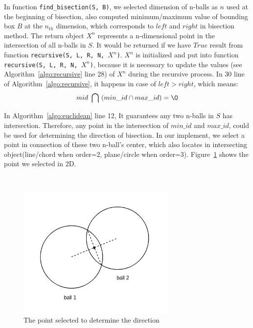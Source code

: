 In function \texttt{find\_bisection(S, B)}, we selected dimension of n-balls as
$n$ used at the beginning of bisection, also computed minimum/maximum value of
bounding box $B$ at the $n_{th}$ dimension, which corresponds to $left$ and
$right$ in bisection method. The return object $X^n$ represents a n-dimensional
point in the intersection of all n-balls in $S$. It would be returned if we have
$True$ result from function \texttt{recursive(S, L, R, N, $X^n$)}. $X^n$ is
initialized and put into function \texttt{recursive(S, L, R, N, $X^n$)}, because
it is necessary to update the values (see Algorithm~\ref{algo:recursive} line
28) of $X^n$ during the recursive process. In 30 line of
Algorithm~\ref{algo:recursive}, it happens in case of $left > right$, which
means:
\begin{equation*}
    mid \  \bigcap \  (min\_id \cap max\_id) = \O
\end{equation*}

In Algorithm~\ref{algo:euclidean} line 12, It guarantees any two n-balls in $S$
has intersection. Therefore, any point in the intersection of $min\_id$ and
$max\_id$, could be used for determining the direction of bisection. In our
implement, we select a point in connection of these two n-ball's center, which
also locates in intersecting object(line/chord when order=2, plane/circle when
order=3). Figure~\ref{fig:compare_point} shows the point we selected in 2D.

\\

\begin{figure}
  \centering
\includegraphics[width=0.7\textwidth]{figures/point-in-chord.png}
\caption{The point selected to determine the direction}
\label{fig:compare_point}
\end{figure}


